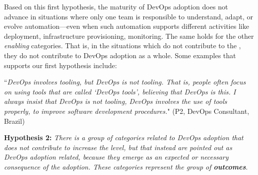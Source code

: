 Based on this first hypothesis, the maturity of DevOps adoption does not
advance in situations where only one team is responsible to understand, adapt, or
evolve automation---even when such automation supports different activities like deployment, infrastructure provisioning,
monitoring. The same holds for the other \emph{enabling} categories. That is, in the situations which
 do not contribute to
the \cc, they do not contribute to DevOps adoption as a whole. Some examples
that supports our first hypothesis include:



\begin{mq}
``\emph{DevOps involves tooling, but DevOps is not tooling. That is, people often
focus on using tools that are called `DevOps tools', believing that DevOps is
this. I always insist that DevOps is not tooling, DevOps involves the use of
tools properly, to improve software development procedures.}" (P2, DevOps
Consultant, Brazil)
\end{mq}



\begin{mh}
\textbf{Hypothesis 2:} \textit{There is a group of categories related to DevOps adoption
that does not contribute to increase the} \cc \emph{level, but that instead are
pointed out as DevOps adoption related, because they emerge as an expected or
necessary consequence of the adoption. These categories represent the group of
\textbf{outcomes}}.
\end{mh}

